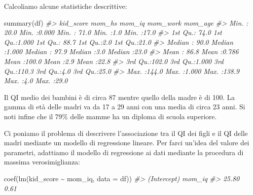 \documentclass[
  10pt,
  italian,
  a4paper,
  extrafontsizes,onecolumn,openright
  ]{memoir}
\newenvironment{Shaded}{\begin{snugshade}}{\end{snugshade}}
\newcommand{\AttributeTok}[1]{\textcolor[rgb]{0.77,0.63,0.00}{#1}}
\newcommand{\CommentTok}[1]{\textcolor[rgb]{0.56,0.35,0.01}{\textit{#1}}}
\newcommand{\FunctionTok}[1]{\textcolor[rgb]{0.00,0.00,0.00}{#1}}
\newcommand{\NormalTok}[1]{#1}
\newcommand{\SpecialCharTok}[1]{\textcolor[rgb]{0.00,0.00,0.00}{#1}}
\begin{document}
Calcoliamo alcune statistiche descrittive:

\begin{Shaded}
\begin{Highlighting}[]
\FunctionTok{summary}\NormalTok{(df)}
\CommentTok{\#\textgreater{}    kid\_score         mom\_hs          mom\_iq         mom\_work      mom\_age    }
\CommentTok{\#\textgreater{}  Min.   : 20.0   Min.   :0.000   Min.   : 71.0   Min.   :1.0   Min.   :17.0  }
\CommentTok{\#\textgreater{}  1st Qu.: 74.0   1st Qu.:1.000   1st Qu.: 88.7   1st Qu.:2.0   1st Qu.:21.0  }
\CommentTok{\#\textgreater{}  Median : 90.0   Median :1.000   Median : 97.9   Median :3.0   Median :23.0  }
\CommentTok{\#\textgreater{}  Mean   : 86.8   Mean   :0.786   Mean   :100.0   Mean   :2.9   Mean   :22.8  }
\CommentTok{\#\textgreater{}  3rd Qu.:102.0   3rd Qu.:1.000   3rd Qu.:110.3   3rd Qu.:4.0   3rd Qu.:25.0  }
\CommentTok{\#\textgreater{}  Max.   :144.0   Max.   :1.000   Max.   :138.9   Max.   :4.0   Max.   :29.0}
\end{Highlighting}
\end{Shaded}

Il QI medio dei bambini è di circa 87 mentre quello della madre è di 100. La gamma di età delle madri va da 17 a 29 anni con una media di circa 23 anni. Si noti infine che il 79\% delle mamme ha un diploma di scuola superiore.

Ci poniamo il problema di descrivere l'associazione tra il QI dei figli e il QI delle madri mediante un modello di regressione lineare. Per farci un'idea del valore dei parametri, adattiamo il modello di regressione ai dati mediante la procedura di massima verosimiglianza:

\begin{Shaded}
\begin{Highlighting}[]
\FunctionTok{coef}\NormalTok{(}\FunctionTok{lm}\NormalTok{(kid\_score }\SpecialCharTok{\textasciitilde{}}\NormalTok{ mom\_iq, }\AttributeTok{data =}\NormalTok{ df))}
\CommentTok{\#\textgreater{} (Intercept)      mom\_iq }
\CommentTok{\#\textgreater{}       25.80        0.61}
\end{Highlighting}
\end{Shaded}
\end{document}
